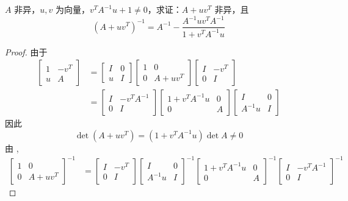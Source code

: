 \documentclass[twoside,openright]{book}
\begin{document}
\begin{CJK*}{UTF8}{}
\begin{quest}
\label{quest:109}
$A$ 非异，$u, v$ 为向量，$v^TA^{-1}u+1\ne0$，求证：$A+uv^T$ 非异，且
\[
(A+uv^T)^{-1}=A^{-1}-\frac{A^{-1}uv^TA^{-1}}{1+v^TA^{-1}u}
\]
\end{quest}
\begin{proof}
由于
\begin{equation}
\label{equ:schur}
\begin{aligned}
\begin{bmatrix} 1 & -v^T \\ u & A \end{bmatrix}&=
\begin{bmatrix} I & 0 \\ u & I \end{bmatrix}\begin{bmatrix} 1 & 0 \\ 0 & A+uv^T  \end{bmatrix}
\begin{bmatrix} I & -v^T \\ 0 & I \end{bmatrix} \\
&=\begin{bmatrix} I & -v^TA^{-1} \\ 0 & I \end{bmatrix}\begin{bmatrix} 1+v^TA^{-1}u & 0 \\ 0 & A  \end{bmatrix}
\begin{bmatrix} I & 0\\ A^{-1}u & I \end{bmatrix}
\end{aligned}
\end{equation}
因此
\[
\det (A+uv^T)=  (1+v^TA^{-1}u)\det A \neq 0
\]
由 ,
\begin{align*}
\begin{bmatrix} 1 & 0 \\ 0 & A+uv^T  \end{bmatrix}^{-1}&=
\begin{bmatrix} I & -v^T \\ 0 & I \end{bmatrix}\begin{bmatrix} I & 0\\ A^{-1}u & I \end{bmatrix}^{-1}
\begin{bmatrix} 1+v^TA^{-1}u & 0 \\ 0 & A  \end{bmatrix}^{-1}\begin{bmatrix} I & -v^TA^{-1} \\ 0 & I \end{bmatrix}^{-1}

\end{align*}
\end{proof}
\end{CJK*}
\end{document}
